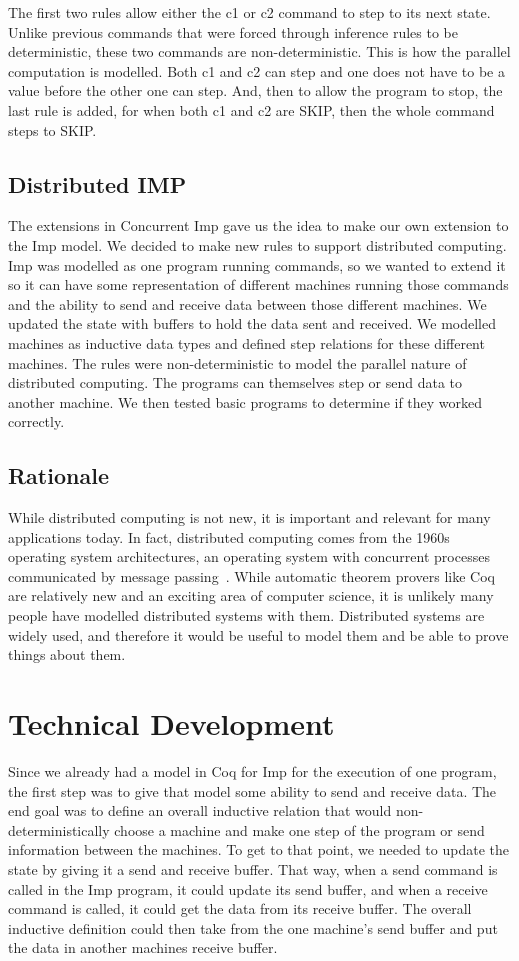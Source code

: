 \documentclass{llncs}
\begin{document}
The first two rules allow either the c1 or c2 command to step to its next state. Unlike previous commands that were forced through inference rules to be deterministic, these two commands are non-deterministic. This is how the parallel computation is modelled. Both c1 and c2 can step and one does not have to be a value before the other one can step. And, then to allow the program to stop, the last rule is added, for when both c1 and c2 are SKIP, then the whole command steps to SKIP. 

\subsection{Distributed IMP} 
The extensions in Concurrent Imp gave us the idea to make our own extension to the Imp model. We decided to make new rules to support distributed computing. Imp was modelled as one program running commands, so we wanted to extend it so it can have some representation of different machines running those commands and the ability to send and receive data between those different machines. We updated the state with buffers to hold the data sent and received. We modelled machines as inductive data types and defined step relations for these different machines. The rules were non-deterministic to model the parallel nature of distributed computing. The programs can themselves step or send data to another machine. We then tested basic programs to determine if they worked correctly.

\subsection{Rationale}
While distributed computing is not new, it is important and relevant for many applications today. In fact, distributed computing comes from the 1960s operating system architectures, an operating system with concurrent processes communicated by message passing~\cite{foundations}. While automatic theorem provers like Coq are relatively new and an exciting area of computer science, it is unlikely many people have modelled distributed systems with them. Distributed systems are widely used, and therefore it would be useful to model them and be able to prove things about them. 

\section{Technical Development}
Since we already had a model in Coq for Imp for the execution of one program, the first step was to give that model some ability to send and receive data. The end goal was to define an overall inductive relation that would non-deterministically choose a machine and make one step of the program or send information between the machines. To get to that point, we needed to update the state by giving it a send and receive buffer. That way, when a send command is called in the Imp program, it could update its send buffer, and when a receive command is called, it could get the data from its receive buffer. The overall inductive definition could then take from the one machine's send buffer and put the data in another machines receive buffer.
\end{document}
